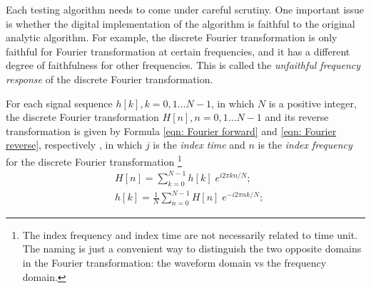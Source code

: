 \documentclass[twoside]{article}
\numberwithin{equation}{section}
\begin{document}
\fi


Each testing algorithm needs to come under careful scrutiny.  
One important issue is whether the digital implementation of the algorithm is faithful to the original analytic algorithm.  
For example, the discrete Fourier transformation is only faithful for Fourier transformation at certain frequencies, and it has a different degree of faithfulness for other frequencies.  
This is called the \emph{unfaithful frequency response} of the discrete Fourier transformation.

For each signal sequence $h[k], k = 0, 1 \dots  N-1$, in which $N$ is a positive integer, the discrete Fourier transformation $H[n], n = 0, 1 \dots  N-1$ and its reverse transformation is given by Formula \eqref{eqn: Fourier forward} and \eqref{eqn: Fourier reverse}, respectively  \cite{Numerical_Recipes}, in which $j$ is the \emph{index time} and $n$ is the \emph{index frequency} for the discrete Fourier transformation
\footnote{The index frequency and index time are not necessarily related to time unit.  
The naming is just a convenient way to distinguish the two opposite domains in the Fourier transformation: the waveform domain vs the frequency domain.}
\begin{align}
\label{eqn: Fourier forward}
& H[n]=\sum_{k=0}^{N-1} h[k] \; e^{i 2\pi k n/N}; \\
\label{eqn: Fourier reverse}
& h[k]=\frac{1}{N} \sum_{n=0}^{N-1} H[n] \; e^{-i 2\pi n k/N};
\end{align}
\end{document}

